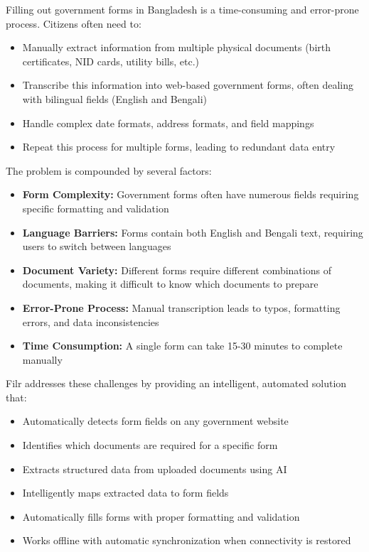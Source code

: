\documentclass[11pt, a4paper]{article}
\theoremstyle{plain}
\theoremstyle{definition}
\begin{document}
Filling out government forms in Bangladesh is a time-consuming and error-prone process. Citizens often need to:
\begin{itemize}
    \item Manually extract information from multiple physical documents (birth certificates, NID cards, utility bills, etc.)
    \item Transcribe this information into web-based government forms, often dealing with bilingual fields (English and Bengali)
    \item Handle complex date formats, address formats, and field mappings
    \item Repeat this process for multiple forms, leading to redundant data entry
\end{itemize}

The problem is compounded by several factors:
\begin{itemize}
    \item \textbf{Form Complexity:} Government forms often have numerous fields requiring specific formatting and validation
    \item \textbf{Language Barriers:} Forms contain both English and Bengali text, requiring users to switch between languages
    \item \textbf{Document Variety:} Different forms require different combinations of documents, making it difficult to know which documents to prepare
    \item \textbf{Error-Prone Process:} Manual transcription leads to typos, formatting errors, and data inconsistencies
    \item \textbf{Time Consumption:} A single form can take 15-30 minutes to complete manually
\end{itemize}

Filr addresses these challenges by providing an intelligent, automated solution that:
\begin{itemize}
    \item Automatically detects form fields on any government website
    \item Identifies which documents are required for a specific form
    \item Extracts structured data from uploaded documents using AI
    \item Intelligently maps extracted data to form fields
    \item Automatically fills forms with proper formatting and validation
    \item Works offline with automatic synchronization when connectivity is restored
\end{itemize}
\end{document}
